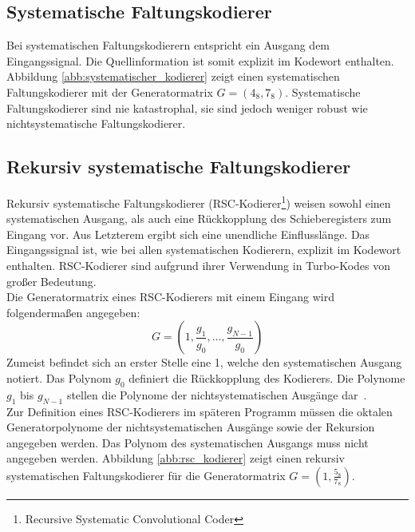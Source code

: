 \subsection{Systematische Faltungskodierer}
\label{kapitel:grundlagen_systematische_kodierer}
Bei systematischen Faltungskodierern entspricht ein Ausgang dem Eingangssignal. Die Quellinformation ist somit explizit im Kodewort enthalten. Abbildung \ref{abb:systematischer_kodierer} zeigt einen systematischen Faltungskodierer mit der Generatormatrix $G=\left( 4_{8},7_{8}\right)$. Systematische Faltungskodierer sind nie katastrophal, sie sind jedoch weniger robust wie nichtsystematische Faltungskodierer.~\cite[S.~217]{schonfeld2012informations}

\subsection{Rekursiv systematische Faltungskodierer}
\label{kapitel:grundlagen_rsc}
Rekursiv systematische Faltungskodierer (RSC-Kodierer\footnote{Recursive Systematic Convolutional Coder}) weisen sowohl einen systematischen Ausgang, als auch eine Rückkopplung des Schieberegisters zum Eingang vor. Aus Letzterem ergibt sich eine unendliche Einflusslänge. Das Eingangssignal ist, wie bei allen systematischen Kodierern, explizit im Kodewort enthalten. RSC-Kodierer sind aufgrund ihrer Verwendung in Turbo-Kodes von großer Bedeutung.
\\
Die Generatormatrix eines RSC-Kodierers mit einem Eingang wird folgendermaßen angegeben:
\begin{equation}
G=\left( 1, \frac{g_{1}}{g_{0}},\dots , \frac{g_{N-1}}{g_{0}} \right)
\end{equation}
Zumeist befindet sich an erster Stelle eine 1, welche den systematischen Ausgang notiert. Das Polynom $g_{0}$ definiert die Rückkopplung des Kodierers. Die Polynome $g_{1}$ bis $g_{N-1}$ stellen die Polynome der nichtsystematischen Ausgänge dar~\cite[S.~92~f.]{morelos2006art}.
\\
Zur Definition eines RSC-Kodierers im späteren Programm müssen die oktalen Generatorpolynome der nichtsystematischen Ausgänge sowie der Rekursion angegeben werden. Das Polynom des systematischen Ausgangs muss nicht angegeben werden. Abbildung \ref{abb:rsc_kodierer} zeigt einen rekursiv systematischen Faltungskodierer für die Generatormatrix $G=\left( 1,\frac{5_{8}}{7_{8}}\right)$.

